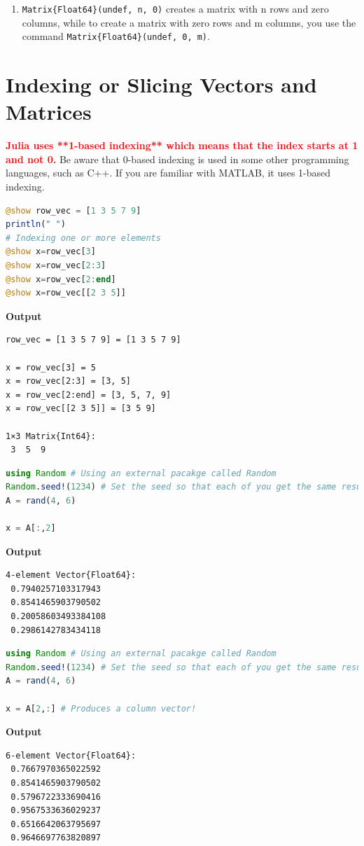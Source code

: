 \begin{enumerate}
\item  \texttt{Matrix\{Float64\}(undef, n, 0)} creates a matrix with n rows and zero columns, while to create a matrix with zero rows and m columns, you use the command \texttt{Matrix\{Float64\}(undef, 0, m)}.


\end{enumerate}


\section{Indexing or Slicing Vectors and Matrices}
\label{sec:AppendixA:Indexing}

\begin{rem}
\textcolor{red}{\bf Julia uses **1-based indexing** which means that the index starts at 1 and not 0.} Be aware that 0-based indexing is used in some other programming languages, such as C++. If you are familiar with MATLAB, it uses 1-based indexing.
\end{rem}


\begin{lstlisting}[language=Julia,style=mystyle]
@show row_vec = [1 3 5 7 9]
println(" ")
# Indexing one or more elements 
@show x=row_vec[3]
@show x=row_vec[2:3]
@show x=row_vec[2:end]
@show x=row_vec[[2 3 5]]
\end{lstlisting}
\textbf{Output} 
\begin{verbatim}
row_vec = [1 3 5 7 9] = [1 3 5 7 9]
 
x = row_vec[3] = 5
x = row_vec[2:3] = [3, 5]
x = row_vec[2:end] = [3, 5, 7, 9]
x = row_vec[[2 3 5]] = [3 5 9]

1×3 Matrix{Int64}:
 3  5  9
\end{verbatim}

\begin{lstlisting}[language=Julia,style=mystyle]
using Random # Using an external pacakge called Random 
Random.seed!(1234) # Set the seed so that each of you get the same results. 
A = rand(4, 6)

x = A[:,2]
\end{lstlisting}
\textbf{Output} 
\begin{verbatim}
4-element Vector{Float64}:
 0.7940257103317943
 0.8541465903790502
 0.20058603493384108
 0.2986142783434118
\end{verbatim}

\begin{lstlisting}[language=Julia,style=mystyle]
using Random # Using an external pacakge called Random 
Random.seed!(1234) # Set the seed so that each of you get the same results. 
A = rand(4, 6)

x = A[2,:] # Produces a column vector!
\end{lstlisting}
\textbf{Output} 
\begin{verbatim}
6-element Vector{Float64}:
 0.7667970365022592
 0.8541465903790502
 0.5796722333690416
 0.9567533636029237
 0.6516642063795697
 0.9646697763820897
\end{verbatim}

